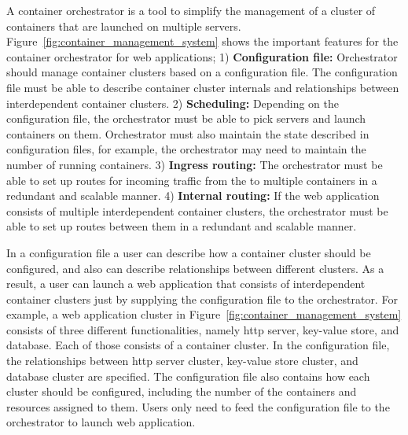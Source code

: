 A container orchestrator is a tool to simplify the management of a cluster of containers that are launched on multiple servers.
%
%
Figure~\ref{fig:container_management_system} shows the important features for the container orchestrator for web applications;
1) {\bf Configuration file:} Orchestrator should manage container clusters based on a configuration file. 
The configuration file must be able to describe container cluster internals and relationships between interdependent container clusters.
2) {\bf Scheduling:} Depending on the configuration file, the orchestrator must be able to pick servers and launch containers on them.
Orchestrator must also maintain the state described in configuration files, for example, the orchestrator may need to maintain the number of running containers.
3) {\bf Ingress routing:} The orchestrator must be able to set up routes for incoming traffic from the  to multiple containers in a redundant and scalable manner.
4) {\bf Internal routing:} If the web application consists of multiple interdependent container clusters, the orchestrator must be able to set up routes between them in a redundant and scalable manner.

In a configuration file a user can describe how a container cluster should be configured, and also can describe relationships between different clusters.
As a result, a user can launch a web application that consists of interdependent container clusters just by supplying the configuration file to the orchestrator.
For example, a web application cluster in Figure~\ref{fig:container_management_system} consists of three different functionalities, namely http server, key-value store, and database.
Each of those consists of a container cluster.
In the configuration file, the relationships between http server cluster, key-value store cluster, and database cluster are specified.
The configuration file also contains how each cluster should be configured, including the number of the containers and resources assigned to them.
Users only need to feed the configuration file to the orchestrator to launch  web application.

